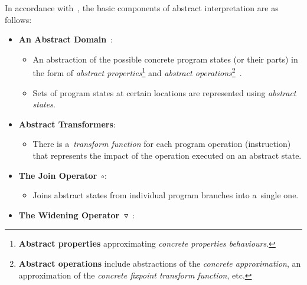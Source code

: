 In accordance with~\cite{favAI, projectPracticeMarcin2018}, the basic
components of abstract interpretation are as follows:
\begin{itemize}
    \item
        \textbf{An Abstract Domain}~\cite{AICousotWeb}:

        \begin{itemize}
            \item
                An abstraction of the possible concrete program states
                (or their parts) in the form of \emph{abstract
                properties}\footnote{\textbf{Abstract properties}
                approximating \emph{concrete properties behaviours}.}
                and \emph{abstract operations}\footnote{\textbf{Abstract
                operations} include abstractions of the \emph{concrete
                approximation}, an approximation of the \emph{concrete
                fixpoint transform function},
                etc.}~\cite{AIBasedFormalMethodsCousot}.

            \item
                Sets of program states at certain locations are represented
                using \emph{abstract states}.
        \end{itemize}

    \item
        \textbf{Abstract Transformers}:

        \begin{itemize}
            \item
                There is a~\emph{transform function} for each program
                operation (instruction) that represents the impact
                of the operation executed on an abstract state.
        \end{itemize}

    \item
        \textbf{The Join Operator}~$ \circ $:

        \begin{itemize}
            \item
                Joins abstract states from individual program branches into
                a~single one.
        \end{itemize}

    \item
        \textbf{The Widening
        Operator~$ \triangledown $}~\cite{programAnalysisNielson,
        wideningNarrowingCousot, favAI}:


\end{itemize}
